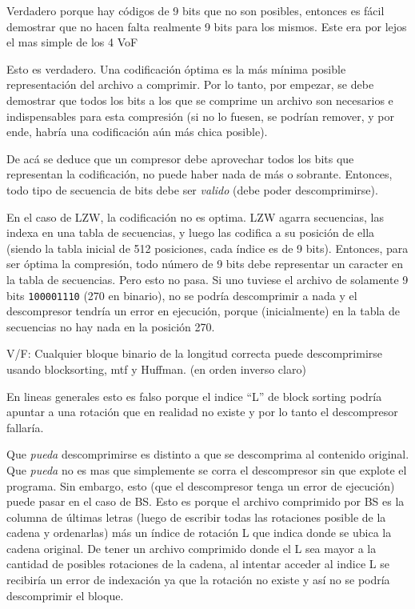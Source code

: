 \documentclass[a4paper]{article}
\newenvironment{enunciado}[3]{%
    \vspace{\baselineskip}
    \tcolorbox[beamer,%
    noparskip,breakable,
    colback=LightGreen,colframe=DarkGreen,%
    colbacklower=LimeGreen!75!LightGreen,%
    title=\small Enunciado: Año #1\, Cuatrimestre #2\, Oportunidad #3]}%
    {\endtcolorbox}
\newenvironment{criterio}[3]{%
    \tcolorbox[beamer,%
    noparskip,breakable,
    colback=LightCoral,colframe=DarkRed,%
    colbacklower=Tomato!75!LightCoral,%
    title=\small Criterio de Corrección: Año #1\, Cuatrimestre #2\, Oportunidad #3]}%
    {\endtcolorbox}
\begin{document}
    \begin{criterio}{2014}{1}{2}
        Verdadero porque hay códigos de 9 bits que no son posibles, entonces es fácil demostrar que no hacen falta realmente 9 bits para los mismos. Este era por lejos el mas simple de los 4 VoF
    \end{criterio}

    Esto es verdadero. Una codificación óptima es la más mínima posible representación del archivo a comprimir. Por lo tanto, por empezar, se debe demostrar que todos los bits a los que se comprime un archivo son necesarios e indispensables para esta compresión (si no lo fuesen, se podrían remover, y por ende, habría una codificación aún más chica posible).
    
    De acá se deduce que un compresor debe aprovechar todos los bits que representan la codificación, no puede haber nada de más o sobrante. Entonces, todo tipo de secuencia de bits debe ser \textit{valido} (debe poder descomprimirse). 

	En el caso de LZW, la codificación no es optima. LZW agarra secuencias, las indexa en una tabla de secuencias, y luego las codifica a su posición de ella (siendo la tabla inicial de 512 posiciones, cada índice es de 9 bits). Entonces, para ser óptima la compresión, todo número de 9 bits debe representar un caracter en la tabla de secuencias. Pero esto no pasa. Si uno tuviese el archivo de solamente 9 bits \texttt{100001110}  (270 en binario), no se podría descomprimir a nada y el descompresor tendría un error en ejecución, porque (inicialmente) en la tabla de secuencias no hay nada en la posición 270.

    \begin{enunciado}{2014}{1}{2}
        V/F: Cualquier bloque binario de la   longitud   correcta   puede descomprimirse   usando   blocksorting,   mtf   y   Huffman.   (en orden inverso claro)
    \end{enunciado}

    \begin{criterio}{2014}{1}{2}
        En lineas generales esto es falso porque el indice “L” de block sorting podría apuntar a una rotación que en realidad no existe y por lo tanto el descompresor fallaría.
    \end{criterio}

    Que \textit{pueda} descomprimirse es distinto a que se descomprima al contenido original. Que \textit{pueda} no es mas que simplemente se corra el descompresor sin que explote el programa. Sin embargo, esto (que el descompresor tenga un error de ejecución) puede pasar en el caso de BS. Esto es porque el archivo comprimido por BS es la columna de últimas letras (luego de escribir todas las rotaciones posible de la cadena y ordenarlas) más un índice de rotación L que indica donde se ubica la cadena original. De tener un archivo comprimido donde el L sea mayor a la cantidad de posibles rotaciones de la cadena, al intentar acceder al indice L se recibiría un error de indexación ya que la rotación no existe y así no se podría descomprimir el bloque.
\end{document}
